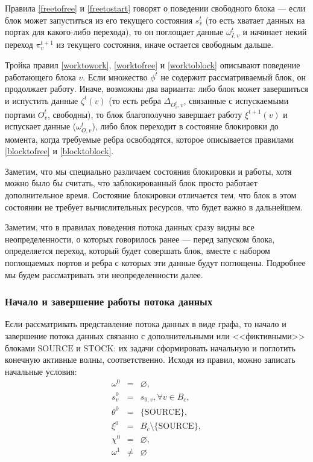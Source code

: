 \documentclass[10pt,a4paper]{article}
\newcommand{\stock}{\text{STOCK}}
\newcommand{\source}{\text{SOURCE}}
\begin{document}
Правила \eqref{freetofree} и \eqref{freetostart} говорят о поведении свободного блока --- если блок может запуститься из его текущего состояния $s^t_v$
(то есть хватает данных на портах для какого-либо перехода), то он поглощает данные $\omega^t_{I, v}$ и
начинает некий переход $\pi^{t+1}_v$ из текущего состояния, иначе остается свободным дальше.

Тройка правил \eqref{worktowork}, \eqref{worktofree} и \eqref{worktoblock} описывают поведение работающего блока $v$. Если множество $\phi^t$ не содержит рассматриваемый блок,
он продолжает работу. Иначе, возможны два варианта: либо блок может завершиться и испустить данные $\zeta^t(v)$ (то есть ребра $\Delta_{O^t_v, v}$, связанные с
испускаемыми портами $O^t_v$, свободны), то блок благополучно завершает работу $\xi^{t + 1}(v)$ и испускает данные ($\omega^t_{O, v}$),
либо блок переходит в состояние блокировки до момента, когда требуемые ребра освободятся, которое описывается правилами \eqref{blocktofree} и \eqref{blocktoblock}.

Заметим, что мы специально различаем состояния блокировки и работы, хотя можно было бы считать, что заблокированный блок просто работает дополнительное время.
Состояние блокировки отличается тем, что блок в этом состоянии не требует вычислительных ресурсов, что будет важно в дальнейшем.

Заметим, что в правилах поведения потока данных сразу видны все неопределенности, о которых говорилось ранее --- перед запуском блока, определяется переход,
который будет совершать блок, вместе с набором поглощаемых портов и ребра с которых эти данные будут поглощены. Подробнее мы будем рассматривать эти неопределенности далее.

\subsubsection{Начало и завершение работы потока данных}
  Если рассматривать представление потока данных в виде графа, то начало и завершение потока данных связанно с дополнительными или <<фиктивными>>
  блоками $\source$ и $\stock$: их задачи сформировать начальную и поглотить конечную активные волны, соответственно.
  Исходя из правил, можно записать начальные условия:
  \begin{eqnarray}
    \omega^0 & = & \varnothing, \\
    s^0_v & = & s_{0, v}, \forall v \in B_c, \\
    \theta^0 & = & \{\source\}, \\
    \xi^0 & = & B_c \setminus \{\source\}, \\
    \chi^0 & = & \varnothing, \\
    \omega^1 & \neq & \varnothing
  \end{eqnarray}
  
\end{document}
